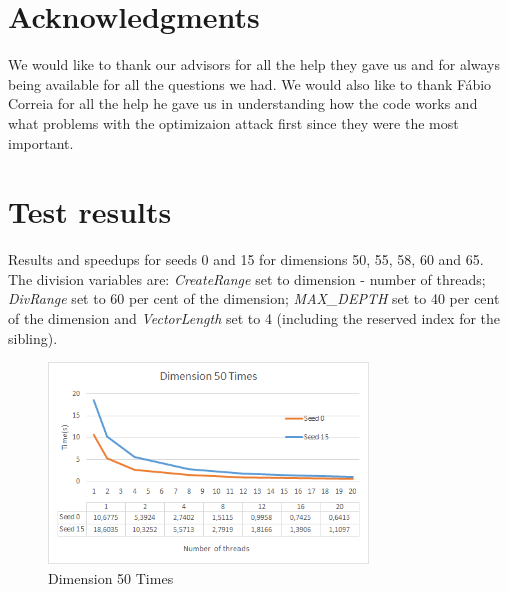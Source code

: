 \documentclass[conference]{IEEEtran}
\begin{document}
\section*{Acknowledgments}
We would like to thank our advisors for all the help they gave us and for always being available for all the questions we had. 
We would also like to thank Fábio Correia for all the help he gave us in understanding how the code works and what problems with the optimizaion attack first since they were the most important. 

\printbibliography
\nocite{latticeAverage}
\nocite{fabio}
\nocite{parallel}



\clearpage
\appendices
\section{Test results}
Results and speedups for seeds 0 and 15 for dimensions 50, 55, 58, 60 and 65. The division variables are: \emph{CreateRange} set to dimension - number of threads; \emph{DivRange} set to 60 per cent of the dimension; \emph{MAX\_DEPTH} set to 40 per cent of the dimension and \emph{VectorLength} set to 4 (including the reserved index for the sibling).

\begin{figure}[H]
\centering
\includegraphics[width=85mm]{TestesFinais/Dimension50Times}
\caption{Dimension 50 Times}
\end{figure}
\end{document}
